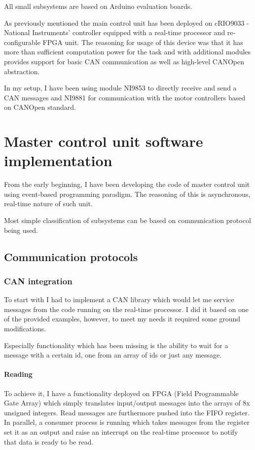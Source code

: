 All small subsystems are based on Arduino evaluation boards.




As previously mentioned the main control unit has been deployed on cRIO9033 - National Instruments' controller equipped with a real-time processor and re-configurable FPGA unit. The reasoning for usage of this device was that it has more than sufficient computation power for the task and with additional modules provides support for basic CAN communication as well as high-level CANOpen abstraction.


In my setup, I have been using module NI9853 to directly receive and send a CAN messages and NI9881 for communication with the motor controllers based on CANOpen standard.

\section{Master control unit software implementation}
From the early beginning, I have been developing the code of master control unit using event-based programming paradigm. The reasoning of this is asynchronous, real-time nature of such unit.

Most simple classification of subsystems can be based on communication protocol being used. 

\subsection{Communication protocols}

\subsubsection{CAN integration}
To start with I had to implement a CAN library which would let me service messages from the code running on the real-time processor. I did it based on one of the provided examples, however, to meet my needs it required some ground modifications.

Especially functionality which has been missing is the ability to wait for a message with a certain id, one from an array of ids or just any message. 
\paragraph{Reading}

To achieve it, I have a functionality deployed on FPGA (Field Programmable Gate Array) which simply translates input/output messages into the arrays of 8x unsigned integers. Read messages are furthermore pushed into the FIFO register. In parallel, a consumer process is running which takes messages from the register set it as an output and raise an interrupt on the real-time processor to notify that data is ready to be read.

